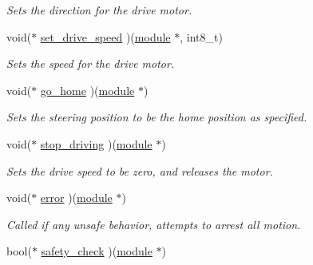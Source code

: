 \begin{DoxyCompactItemize}
\begin{DoxyCompactList}\small\item\em Sets the direction for the drive motor. \end{DoxyCompactList}\item 
\hypertarget{structmodule__assembly_a2b9f569a74bd58b94c4dfcd6b357766c}{}void($\ast$ \hyperlink{structmodule__assembly_a2b9f569a74bd58b94c4dfcd6b357766c}{set\+\_\+drive\+\_\+speed} )(\hyperlink{structmodule__assembly}{module} $\ast$, int8\+\_\+t)\label{structmodule__assembly_a2b9f569a74bd58b94c4dfcd6b357766c}

\begin{DoxyCompactList}\small\item\em Sets the speed for the drive motor. \end{DoxyCompactList}\item 
\hypertarget{structmodule__assembly_a80737be0fefbe26802d22311575178cc}{}void($\ast$ \hyperlink{structmodule__assembly_a80737be0fefbe26802d22311575178cc}{go\+\_\+home} )(\hyperlink{structmodule__assembly}{module} $\ast$)\label{structmodule__assembly_a80737be0fefbe26802d22311575178cc}

\begin{DoxyCompactList}\small\item\em Sets the steering position to be the home position as specified. \end{DoxyCompactList}\item 
\hypertarget{structmodule__assembly_a5822c3dd913339f91555c66671c7d959}{}void($\ast$ \hyperlink{structmodule__assembly_a5822c3dd913339f91555c66671c7d959}{stop\+\_\+driving} )(\hyperlink{structmodule__assembly}{module} $\ast$)\label{structmodule__assembly_a5822c3dd913339f91555c66671c7d959}

\begin{DoxyCompactList}\small\item\em Sets the drive speed to be zero, and releases the motor. \end{DoxyCompactList}\item 
\hypertarget{structmodule__assembly_acf7475b3f29ca0e782f1ba61c3f91e89}{}void($\ast$ \hyperlink{structmodule__assembly_acf7475b3f29ca0e782f1ba61c3f91e89}{error} )(\hyperlink{structmodule__assembly}{module} $\ast$)\label{structmodule__assembly_acf7475b3f29ca0e782f1ba61c3f91e89}

\begin{DoxyCompactList}\small\item\em Called if any unsafe behavior, attempts to arrest all motion. \end{DoxyCompactList}\item 
\hypertarget{structmodule__assembly_a1ca841fb37dd79a0180306b93f45ef76}{}bool($\ast$ \hyperlink{structmodule__assembly_a1ca841fb37dd79a0180306b93f45ef76}{safety\+\_\+check} )(\hyperlink{structmodule__assembly}{module} $\ast$)\label{structmodule__assembly_a1ca841fb37dd79a0180306b93f45ef76}


\end{DoxyCompactItemize}
